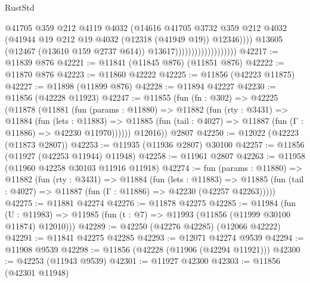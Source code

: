 \begin{lexlean}{RustStd}
\begin{coremodule}
                                              @41705
                                              @359
                                              @212
                                              @4119
                                              @4032
                                              (@14616
                                                @41705
                                                @3732
                                                @359
                                                @212
                                                @4032
                                                (@41944
                                                  @19
                                                  @212
                                                  @19
                                                  @4032
                                                  (@12318 (@41949 @19))
                                                  @12346))))
                                          @13605
                                          (@12467 (@13610 @159 @2737 @614))
                                          @13617)))))))))))))))))))
@42217 := @11839 @876
@42221 := @11841 (@11845 @876) (@11851 @876)
@42222 := @11870 @876
@42223 := @11860 @42222
@42225 := @11856 (@42223 @11875)
@42227 := @11898 (@11899 @876)
@42228 := @11894 @42227
@42230 := @11856 (@42228 @11923)
@42247 := @11855
    (fun (fn : @302) =>
    @42225
      (@11878
        (@11881
          (fun (params : @11880) =>
          @11882
            (fun (rty : @3431) =>
            @11884
              (fun (lets : @11883) =>
              @11885 (fun (tail : @4027) => @11887 (fun (Γ : @11886) => @42230 @11970))))))
        @12016))
    @2807
@42250 := @12022 (@42223 (@11873 @2807))
@42253 := @11935 (@11936 @2807) @30100
@42257 := @11856 (@11927 (@42253 @11944) @11948)
@42258 := @11961 @2807
@42263 := @11958 (@11960 @42258 @30103 @11916 @11918)
@42274 := fun (params : @11880) =>
  @11882
    (fun (rty : @3431) =>
    @11884
      (fun (lets : @11883) =>
      @11885 (fun (tail : @4027) => @11887 (fun (Γ : @11886) => @42230 (@42257 @42263)))))
@42275 := @11881 @42274
@42276 := @11878 @42275
@42285 := @11984
    (fun (U : @11983) => @11985 (fun (t : @7) => @11993 (@11856 (@11999 @30100 @11874) @12010)))
@42289 := @42250 (@42276 @42285) (@12066 @42222)
@42291 := @11841 @42275 @42285
@42293 := @12071 @42274 @9539
@42294 := @11908 @9539
@42298 := @11856 (@42228 (@11906 (@42294 @11921)))
@42300 := @42253 (@11943 @9539)
@42301 := @11927 @42300
@42303 := @11856 (@42301 @11948)

\end{coremodule}
\end{lexlean}
